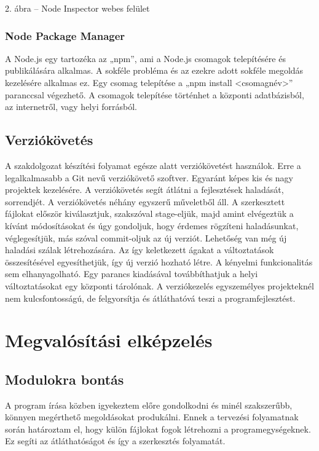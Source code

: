 \documentclass[bibliography=totocnumbered]{article}
\begin{document}
2. ábra -- Node Inspector webes felület


\subsubsection{Node Package Manager}

A Node.js egy tartozéka az „npm'', ami a Node.js csomagok telepítésére
és publikálására alkalmas. A sokféle probléma és az ezekre adott sokféle
megoldás kezelésére alkalmas ez. Egy csomag telepítése a „npm install
\textless{}csomagnév\textgreater{}'' paranccsal végezhető. A csomagok
telepítése történhet a központi adatbázisból, az internetről, vagy helyi
forrásból.


\subsection{Verziókövetés}

A szakdolgozat készítési folyamat egésze alatt verziókövetést használok.
Erre a legalkalmasabb a Git nevű verziókövető szoftver. Egyaránt képes
kis és nagy projektek kezelésére. A verziókövetés segít átlátni a
fejlesztések haladását, sorrendjét. A verziókövetés néhány egyszerű
műveletből áll. A szerkesztett fájlokat először kiválasztjuk, szakszóval
stage-eljük, majd amint elvégeztük a kívánt módosításokat és úgy
gondoljuk, hogy érdemes rögzíteni haladásunkat, véglegesítjük, más
szóval commit-oljuk az új verziót. Lehetőség van még új haladási szálak
létrehozására. Az így keletkezett ágakat a változtatások összesítésével
egyesíthetjük, így új verzió hozható létre. A kényelmi funkcionalitás
sem elhanyagolható. Egy parancs kiadásával továbbíthatjuk a helyi
változtatásokat egy központi tárolónak. A verziókezelés egyszemélyes
projekteknél nem kulcsfontosságú, de felgyorsítja és átláthatóvá teszi a
programfejlesztést.


\section{Megvalósítási
elképzelés}


\subsection{Modulokra bontás }

A program írása közben igyekeztem előre gondolkodni és minél
szakszerűbb, könnyen megérthető megoldásokat produkálni. Ennek a
tervezési folyamatnak során határoztam el, hogy külön fájlokat fogok
létrehozni a programegységeknek. Ez segíti az átláthatóságot és így a
szerkesztés folyamatát.
\end{document}
